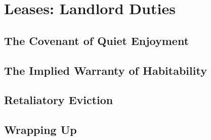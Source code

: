 \chapter{Leases: Landlord Duties}



\section{The Covenant of Quiet Enjoyment}






\begin{questions}

\end{questions}


\section{The Implied Warranty of Habitability}





\begin{questions}


\end{questions}

\begin{questions}[Problem]

\end{questions}



\section{Retaliatory Eviction}




\begin{questions}

\end{questions}


\section{Wrapping Up}


